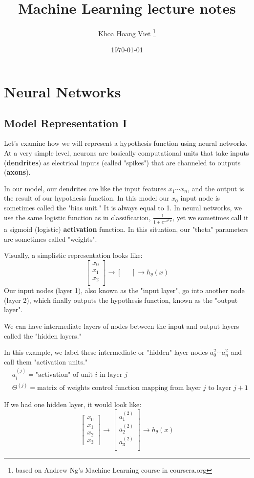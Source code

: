 \documentclass{article}
\title{Machine Learning lecture notes}
\author{Khoa Hoang Viet \thanks{based on Andrew Ng's Machine Learning course in coursera.org}}
\date{\today}
\begin{document}
\section{Neural Networks}
\subsection{Model Representation I}
Let's examine how we will represent a hypothesis function using neural networks. At a very simple level, neurons are basically computational units that take inputs (\textbf{dendrites}) as electrical inputs (called "spikes") that are channeled to outputs (\textbf{axons}). 

In our model, our dendrites are like the input features $x_1\cdots x_n$, and the output is the result of our hypothesis function. In this model our $x_0$ input node is sometimes called the "bias unit." It is always equal to 1. In neural networks, we use the same logistic function as in classification, $\frac{1}{1 + e^{-\theta^Tx}}$, yet we sometimes call it a sigmoid (logistic) \textbf{activation} function. In this situation, our "theta" parameters are sometimes called "weights".

Visually, a simplistic representation looks like:
$$\begin{bmatrix}x_0 \\ x_1 \\ x_2 \\ 
\end{bmatrix}
\rightarrow
\begin{bmatrix}\ \ \ \\ \end{bmatrix}
\rightarrow h_\theta(x)$$
Our input nodes (layer 1), also known as the "input layer", go into another node (layer 2), which finally outputs the hypothesis function, known as the "output layer".

We can have intermediate layers of nodes between the input and output layers called the "hidden layers."

In this example, we label these intermediate or "hidden" layer nodes $a^2_0 \cdots a^2_n$ and call them "activation units."
\begin{align*}
	& a_i^{(j)} = \text{"activation" of unit $i$ in layer $j$} \\
	& \Theta^{(j)} = \text{matrix of weights control function mapping from layer $j$ to layer $j+1$}
\end{align*}

If we had one hidden layer, it would look like:
$$\begin{bmatrix}x_0 \\ x_1 \\ x_2 \\ x_3\end{bmatrix}
\rightarrow
\begin{bmatrix}a_1^{(2)} \\ a_2^{(2)} \\ a_3^{(2)} \\ \end{bmatrix}
\rightarrow h_\theta(x)$$
\end{document}
